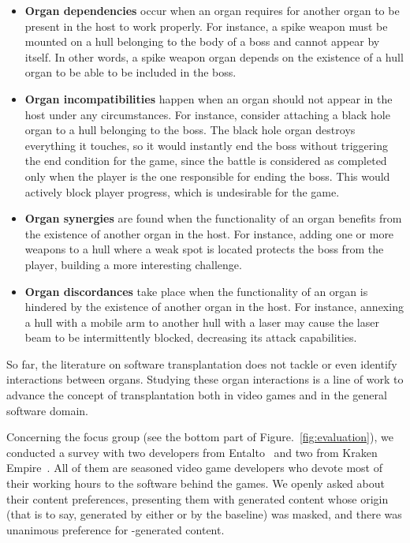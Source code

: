\begin{itemize}
    
    \item \textbf{Organ dependencies} occur when an organ requires for another organ to be present in the host to work properly. For instance, a spike weapon must be mounted on a hull belonging to the body of a boss and cannot appear by itself. In other words, a spike weapon organ depends on the existence of a hull organ to be able to be included in the boss.
    
    \item \textbf{Organ incompatibilities} happen when an organ should not appear in the host under any circumstances. For instance, consider attaching a black hole organ to a hull belonging to the boss. The black hole organ destroys everything it touches, so it would instantly end the boss without triggering the end condition for the game, since the battle is considered as completed only when the player is the one responsible for ending the boss. This would actively block player progress, which is undesirable for the game.
    
    \item \textbf{Organ synergies} are found when the functionality of an organ benefits from the existence of another organ in the host. For instance, adding one or more weapons to a hull where a weak spot is located protects the boss from the player, building a more interesting challenge.
    
    \item \textbf{Organ discordances} take place when the functionality of an organ is hindered by the existence of another organ in the host. For instance, annexing a hull with a mobile arm to another hull with a laser may cause the laser beam to be intermittently blocked, decreasing its attack capabilities.
    
\end{itemize}

So far, the literature on software transplantation does not tackle or even identify interactions between organs. Studying these organ interactions is a line of work to advance the concept of  transplantation both in video games and in the general software domain.

Concerning the focus group (see the bottom part of Figure.~\ref{fig:evaluation}), we conducted a survey with two developers from Entalto~\cite{entaltoweb} and two from Kraken Empire~\cite{krakenweb}. All of them are seasoned video game developers who devote most of their working hours to the software behind the games. We openly asked about their content preferences, presenting them with generated content whose origin (that is to say, generated by either \ApproachName{} or by the baseline) was masked, and there was unanimous preference for \ApproachName{}-generated content. 

